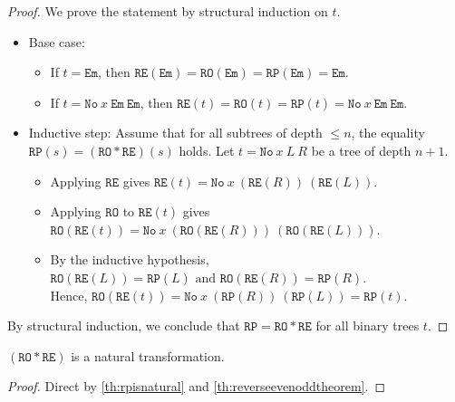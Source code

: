 \begin{proof}
We prove the statement by structural induction on $t$.

\begin{itemize}
    \item Base case:
    \begin{itemize}
        \item If $t = \texttt{Em}$, then 
        \(
        \texttt{RE}(\texttt{Em}) = \texttt{RO}(\texttt{Em}) = \texttt{RP}(\texttt{Em}) = \texttt{Em}.
        \)
        \item If $t = \texttt{No}\ x\ \texttt{Em}\ \texttt{Em}$, then
        \(
        \texttt{RE}(t) = \texttt{RO}(t) = \texttt{RP}(t) = \texttt{No}\ x\ \texttt{Em}\ \texttt{Em}.
        \)
    \end{itemize}
    
    \item Inductive step: Assume that for all subtrees of depth $\le n$, the equality $\texttt{RP}(s) = (\texttt{RO} \ast \texttt{RE})(s)$ holds. Let $t = \texttt{No}\ x\ L\ R$ be a tree of depth $n+1$.
    \begin{itemize}
        \item Applying $\texttt{RE}$ gives
        \(
        \texttt{RE}(t) = \texttt{No}\ x\ (\texttt{RE}(R))\ (\texttt{RE}(L)).
        \)
        \item Applying $\texttt{RO}$ to $\texttt{RE}(t)$ gives
        \(
        \texttt{RO}(\texttt{RE}(t)) = \texttt{No}\ x\ (\texttt{RO}(\texttt{RE}(R)))\ (\texttt{RO}(\texttt{RE}(L))).
        \)
        \item By the inductive hypothesis, 
        \(
        \texttt{RO}(\texttt{RE}(L)) = \texttt{RP}(L) \text{ and } \texttt{RO}(\texttt{RE}(R)) = \texttt{RP}(R).
        \)\\
        Hence,
        \(
        \texttt{RO}(\texttt{RE}(t)) = \texttt{No}\ x\ (\texttt{RP}(R))\ (\texttt{RP}(L)) = \texttt{RP}(t).
        \)
    \end{itemize}
\end{itemize}
By structural induction, we conclude that $\texttt{RP} = \texttt{RO} \ast \texttt{RE}$ for all binary trees $t$.





\end{proof}
\begin{corollary}
\(
(\texttt{RO} \ast \texttt{RE})
\) is a natural transformation.
\end{corollary}
\begin{proof}
  Direct by
  \ref{th:rpisnatural} and
  \ref{th:reverseevenoddtheorem}.
\end{proof}
